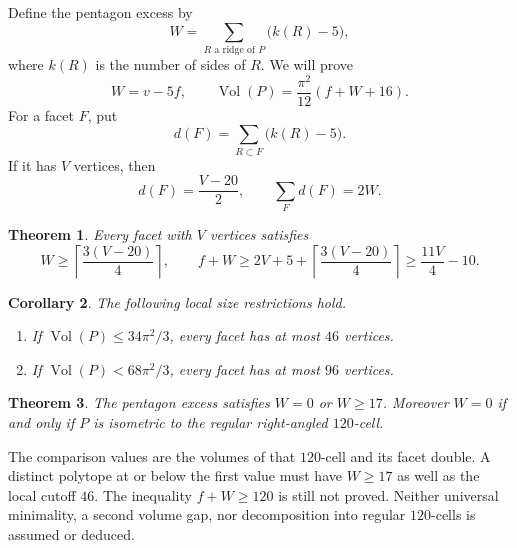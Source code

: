 \documentclass[11pt]{article}
\newtheorem{theorem}{Theorem}
\newtheorem{corollary}[theorem]{Corollary}
\theoremstyle{remark}
\newcommand{\Vol}{\operatorname{Vol}}
\begin{document}
Define the pentagon excess by
\[
 W=\sum_{R\text{ a ridge of }P}\bigl(k(R)-5\bigr),
\]
where $k(R)$ is the number of sides of $R$. We will prove
\begin{equation}\label{eq:volume}
 W=v-5f,\qquad
 \Vol(P)=\frac{\pi^2}{12}(f+W+16).
\end{equation}
For a facet $F$, put
\[
 d(F)=\sum_{R\subset F}\bigl(k(R)-5\bigr).
\]
If it has $V$ vertices, then
\begin{equation}\label{eq:excess-identities}
 d(F)=\frac{V-20}{2},\qquad \sum_Fd(F)=2W.
\end{equation}

\begin{theorem}\label{thm:neighbor-excess}
Every facet with $V$ vertices satisfies
\begin{equation}\label{eq:excess-bound}
 W\ge\left\lceil\frac{3(V-20)}4\right\rceil,\qquad
 f+W\ge2V+5+\left\lceil\frac{3(V-20)}4\right\rceil
       \ge\frac{11V}4-10.
\end{equation}
\end{theorem}

\begin{corollary}\label{cor:local-size}
The following local size restrictions hold.
\begin{enumerate}
\item If $\Vol(P)\le34\pi^2/3$, every facet has at most $46$ vertices.
\item If $\Vol(P)<68\pi^2/3$, every facet has at most $96$ vertices.
\end{enumerate}
\end{corollary}

\begin{theorem}\label{thm:gap}
The pentagon excess satisfies $W=0$ or $W\ge17$. Moreover $W=0$ if
and only if $P$ is isometric to the regular right-angled $120$-cell.
\end{theorem}

The comparison values are the volumes of that $120$-cell and its facet
double. A distinct polytope at or below the first value must have
$W\ge17$ as well as the local cutoff $46$. The inequality
$f+W\ge120$ is still not proved. Neither universal minimality, a second
volume gap, nor decomposition into regular $120$-cells is assumed or
deduced.
\end{document}
